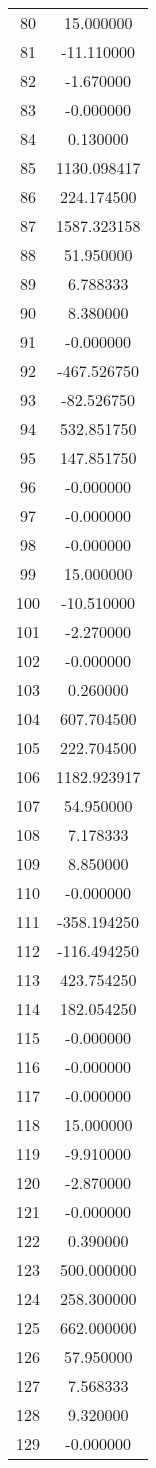 \documentclass[12pt]{article}
\begin{document}
\begin{longtable}{@{}cc@{}}
80 & 15.000000 \\
81 & -11.110000 \\
82 & -1.670000 \\
83 & -0.000000 \\
84 & 0.130000 \\
85 & 1130.098417 \\
86 & 224.174500 \\
87 & 1587.323158 \\
88 & 51.950000 \\
89 & 6.788333 \\
90 & 8.380000 \\
91 & -0.000000 \\
92 & -467.526750 \\
93 & -82.526750 \\
94 & 532.851750 \\
95 & 147.851750 \\
96 & -0.000000 \\
97 & -0.000000 \\
98 & -0.000000 \\
99 & 15.000000 \\
100 & -10.510000 \\
101 & -2.270000 \\
102 & -0.000000 \\
103 & 0.260000 \\
104 & 607.704500 \\
105 & 222.704500 \\
106 & 1182.923917 \\
107 & 54.950000 \\
108 & 7.178333 \\
109 & 8.850000 \\
110 & -0.000000 \\
111 & -358.194250 \\
112 & -116.494250 \\
113 & 423.754250 \\
114 & 182.054250 \\
115 & -0.000000 \\
116 & -0.000000 \\
117 & -0.000000 \\
118 & 15.000000 \\
119 & -9.910000 \\
120 & -2.870000 \\
121 & -0.000000 \\
122 & 0.390000 \\
123 & 500.000000 \\
124 & 258.300000 \\
125 & 662.000000 \\
126 & 57.950000 \\
127 & 7.568333 \\
128 & 9.320000 \\
129 & -0.000000 \\

\end{longtable}
\end{document}
